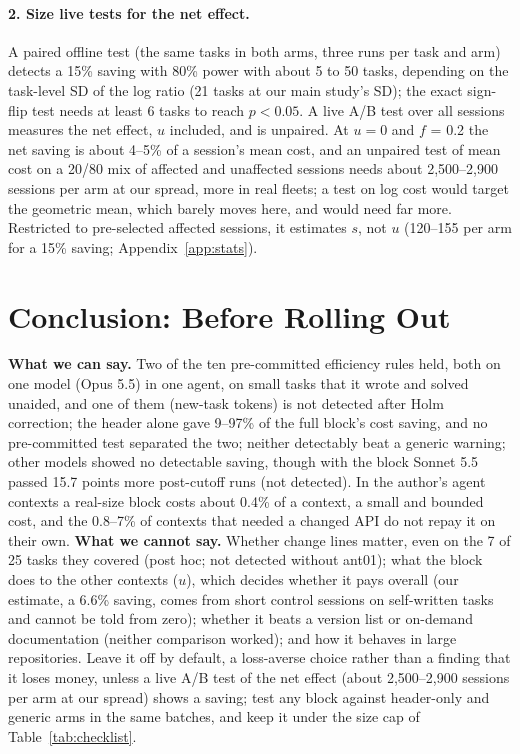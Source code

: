 \documentclass[11pt]{article}
\begin{document}
\paragraph{2. Size live tests for the net effect.}
A paired offline test (the same tasks in both arms, three runs per task and arm) detects a 15\% saving with 80\% power with about 5 to 50 tasks, depending on the task-level SD of the log ratio (21 tasks at our main study's SD); the exact sign-flip test needs at least 6 tasks to reach $p<0.05$.
A live A/B test over all sessions measures the net effect, $u$ included, and is unpaired.
At $u = 0$ and $f$ = 0.2 the net saving is about 4--5\% of a session's mean cost, and an unpaired test of mean cost on a 20/80 mix of affected and unaffected sessions needs about 2,500--2,900 sessions per arm at our spread, more in real fleets; a test on log cost would target the geometric mean, which barely moves here, and would need far more.
Restricted to pre-selected affected sessions, it estimates $s$, not $u$ (120--155 per arm for a 15\% saving; Appendix~\ref{app:stats}).

\section{Conclusion: Before Rolling Out}
\label{sec:conclusion}

\textbf{What we can say.} Two of the ten pre-committed efficiency rules held, both on one model (Opus 5.5) in one agent, on small tasks that it wrote and solved unaided, and one of them (new-task tokens) is not detected after Holm correction; the header alone gave 9--97\% of the full block's cost saving, and no pre-committed test separated the two; neither detectably beat a generic warning; other models showed no detectable saving, though with the block Sonnet 5.5 passed 15.7 points more post-cutoff runs (not detected).
In the author's agent contexts a real-size block costs about 0.4\% of a context, a small and bounded cost, and the 0.8--7\% of contexts that needed a changed API do not repay it on their own.
\textbf{What we cannot say.} Whether change lines matter, even on the 7 of 25 tasks they covered (post hoc; not detected without ant01); what the block does to the other contexts ($u$), which decides whether it pays overall (our estimate, a 6.6\% saving, comes from short control sessions on self-written tasks and cannot be told from zero); whether it beats a version list or on-demand documentation (neither comparison worked); and how it behaves in large repositories.
Leave it off by default, a loss-averse choice rather than a finding that it loses money, unless a live A/B test of the net effect (about 2,500--2,900 sessions per arm at our spread) shows a saving; test any block against header-only and generic arms in the same batches, and keep it under the size cap of Table~\ref{tab:checklist}.
\end{document}
